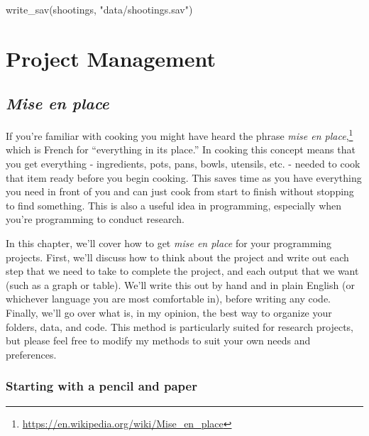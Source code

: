 \documentclass[
]{krantz}
\makeatletter
\newenvironment{Shaded}{\begin{snugshade}}{\end{snugshade}}
\newcommand{\FunctionTok}[1]{\textcolor[rgb]{0,0,0}{#1}}
\newcommand{\NormalTok}[1]{#1}
\newcommand{\StringTok}[1]{\textcolor[rgb]{0.5,0.5,0.5}{#1}}
\renewcommand{\href}[2]{#2\footnote{\url{#1}}}
\newenvironment{kframe}{%
\medskip{}
\setlength{\fboxsep}{.8em}
 \def\at@end@of@kframe{}%
 \ifinner\ifhmode%
  \def\at@end@of@kframe{\end{minipage}}%
  \begin{minipage}{\columnwidth}%
 \fi\fi%
 \def\FrameCommand##1{\hskip\@totalleftmargin \hskip-\fboxsep
 \colorbox{shadecolor}{##1}\hskip-\fboxsep
     \hskip-\linewidth \hskip-\@totalleftmargin \hskip\columnwidth}%
 \MakeFramed {\advance\hsize-\width
   \@totalleftmargin\z@ \linewidth\hsize
   \@setminipage}}%
 {\par\unskip\endMakeFramed%
 \at@end@of@kframe}
\renewenvironment{Shaded}{\begin{kframe}}{\end{kframe}}
\makeatother
\begin{document}
\begin{Shaded}
\begin{Highlighting}[]
\FunctionTok{write\_sav}\NormalTok{(shootings, }\StringTok{"data/shootings.sav"}\NormalTok{)}
\end{Highlighting}
\end{Shaded}

\hypertarget{part-project-management}{%
\part{Project
Management}\label{part-project-management}}

\hypertarget{mise-en-place}{%
\chapter{\texorpdfstring{\emph{Mise en
place}}{Mise en place}}\label{mise-en-place}}

If you're familiar with cooking you might have heard the
phrase
\href{https://en.wikipedia.org/wiki/Mise_en_place}{\emph{mise
en place},} which is French for ``everything in its place.''
In cooking this concept means that you get everything -
ingredients, pots, pans, bowls, utensils, etc. - needed to
cook that item ready before you begin cooking. This saves
time as you have everything you need in front of you and can
just cook from start to finish without stopping to find
something. This is also a useful idea in programming,
especially when you're programming to conduct research.

In this chapter, we'll cover how to get \emph{mise en place}
for your programming projects. First, we'll discuss how to
think about the project and write out each step that we need
to take to complete the project, and each output that we
want (such as a graph or table). We'll write this out by
hand and in plain English (or whichever language you are
most comfortable in), before writing any code. Finally,
we'll go over what is, in my opinion, the best way to
organize your folders, data, and code. This method is
particularly suited for research projects, but please feel
free to modify my methods to suit your own needs and
preferences.

\hypertarget{starting-with-a-pencil-and-paper}{%
\section{Starting with a pencil and
paper}\label{starting-with-a-pencil-and-paper}}
\end{document}
